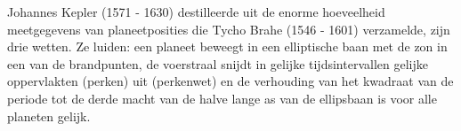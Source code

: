 \documentclass{ximera}
\begin{document}
	\author{Bart Lambregs}
    \xmsource

	

Johannes Kepler (1571 - 1630) destilleerde uit de enorme hoeveelheid meetgegevens van planeetposities die Tycho Brahe (1546 - 1601) verzamelde, zijn drie wetten. Ze luiden: een planeet beweegt in een elliptische baan met de zon in een van de brandpunten, de voerstraal snijdt in gelijke tijdsintervallen gelijke oppervlakten (perken) uit (perkenwet) en de verhouding van het kwadraat van de periode tot de derde macht van de halve lange as van de ellipsbaan is voor alle planeten gelijk.
	
	
\end{document}
